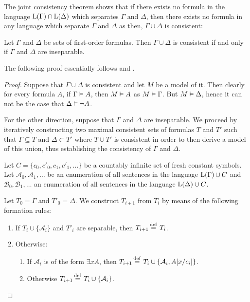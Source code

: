 The joint consistency theorem shows that if there exists no formula in the language $\operatorname{L}(\Gamma)\cap \operatorname{L}(\Delta)$ which separates $\Gamma$ and $\Delta$, then there exists no formula in any language which separate $\Gamma$ and $\Delta$ as then, $\Gamma \cup \Delta$ is consistent:

\begin{thm}
	\label{thm:robinson}
	Let $\Gamma$ and $\Delta$ be sets of first-order formulas.
	Then $\Gamma \cup \Delta$ is consistent if and only if $\Gamma$ and $\Delta$ are inseparable.
\end{thm}
The following proof essentially follows \cite{Henkin63} and \cite{chang1990model}.
\begin{proof}
	Suppose that $\Gamma\cup\Delta$ is consistent and let $M$ be a model of it.
	Then clearly for every formula $A$, if $\Gamma \vDash A$, then $M \vDash A$ as $M \vDash \Gamma$.
	But $M \vDash \Delta$, hence it can not be the case that $\Delta \vDash \lnot A$.

	For the other direction, suppose that $\Gamma$ and $\Delta$ are inseparable.
	We proceed by iteratively constructing two maximal consistent sets of formulas $T$ and $T'$ such that $\Gamma \subseteq T$ and $\Delta \subset T'$ where $T \cup T'$ is consistent in order to then derive a model of this union, thus establishing the consistency of $\Gamma$ and $\Delta$.

	Let $C = \{c_0, c'_0, c_1, c'_1, \dots\}$ be
	a countably infinite set of fresh constant symbols.
	Let $\mathcal{A}_0, \mathcal{A}_1, \dots$ be an enumeration of all sentences in the language $\operatorname{L}(\Gamma) \cup C$
	and $\mathcal{B}_0, \mathcal{B}_1, \dots$ an enumeration of all sentences in the language $\Lang(\Delta) \cup\nolinebreak C$.

	Let $T_0 = \Gamma$ and $T'_0 = \Delta$. 
	We construct
	$T_{i+1}$ 
	from
	$T_{i}$
	by means of the following formation rules:
	\begin{enumerate}[~~(1)]
		\item
			\label{theory_construction_1}
			If $T_{i} \cup \{\mathcal{A}_i\}$ and $T'_{i}$ are separable, then $T_{i+1} \defeq{}\, T_i$.
		\item Otherwise:
			\label{theory_construction_2}
			\begin{enumerate}[(2a)]
				\item If $\mathcal{A}_i$ is of the form $\exists x A$, then $T_{i+1} \defeq{}\, T_i \cup \{ \mathcal{A}_i, A\subst{x/c_i} \}$.
			\label{theory_construction_2a}
				\item Otherwise $T_{i+1} \defeq{}\, T_i \cup \{ \mathcal{A}_i \}$.
			\label{theory_construction_2b}
			\end{enumerate}
	\end{enumerate}


\end{proof}
